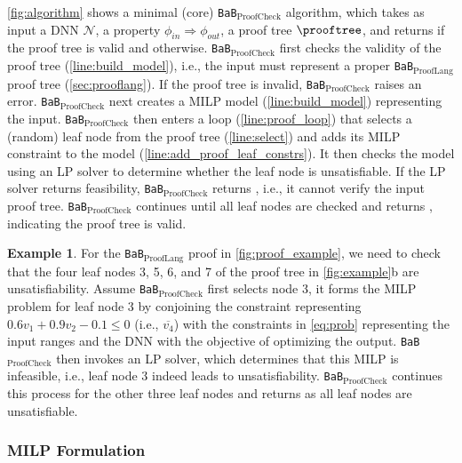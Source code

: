 \documentclass[oneside,11pt,dvipsnames]{book}
\numberwithin{equation}{section}
\theoremstyle{definition}
\newtheorem{example}{Example}[section]
\theoremstyle{remark}
\newcommand{\tvn}[1]{\iftoggle{usecomment}{{\color{red}{[TVN]: #1}}}{}}
\newcommand{\hd}[1]{\iftoggle{usecomment}{{\color{blue}{[HD]: #1}}}{}}
\newcommand{\prooflang}{\texttt{BaB$_{\text{ProofLang}}$}}
\newcommand{\proofcheck}{\texttt{BaB$_{\text{ProofCheck}}$}}
\begin{document}
\autoref{fig:algorithm} shows a minimal (core)  \proofcheck{} algorithm, which takes as input a DNN $\mathcal{N}$, a property $\phi_{in} \Rightarrow \phi_{out}$, a proof tree $\prooftree$, and returns \certified if the proof tree is valid and \uncertified otherwise. 
\proofcheck{} first checks the validity of the proof tree (\autoref{line:build_model}), i.e., the input must represent a proper \prooflang{} proof tree (\autoref{sec:prooflang}).  
If the proof tree is invalid, \proofcheck{} raises an error.
\proofcheck{} next creates a MILP model (\autoref{line:build_model}) representing the input. %
\proofcheck{} then enters a loop (\autoref{line:proof_loop}) that selects a (random) leaf node from the proof tree (\autoref{line:select}) and adds its MILP constraint to the model (\autoref{line:add_proof_leaf_constrs}). It then checks the model using an LP solver to determine whether the leaf node is unsatisfiable. If the LP solver returns feasibility, \proofcheck{} returns \uncertified, i.e., it cannot verify the input proof tree. 
\proofcheck{} continues until all leaf nodes are checked and returns \certified, indicating the proof tree is valid.



\begin{example} 
    For the \prooflang{} proof in \autoref{fig:proof_example}, we need to check that the four leaf nodes 3, 5, 6, and 7 of the proof tree in \autoref{fig:example}b are unsatisfiability. Assume \proofcheck{} first selects node 3, it forms the MILP problem for leaf node 3 by conjoining the constraint representing $0.6v_1 + 0.9v_2 - 0.1 \le 0$ (i.e., $\overline{v_4}$) %
with the constraints in \autoref{eq:prob} representing the input ranges and the DNN with the objective of optimizing the output. \proofcheck{} then invokes an LP solver, which determines that this MILP is infeasible, i.e., leaf node 3 indeed leads to unsatisfiability. \proofcheck{} continues this process for the other three leaf nodes and returns \certified as all leaf nodes are unsatisfiable.
\end{example}

\subsubsection{MILP Formulation}\label{sec:milp-formulation}
\end{document}
